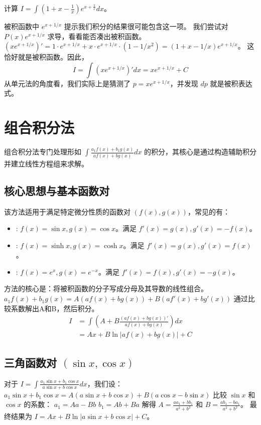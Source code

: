 \documentclass[lang=cn,newtx,10pt,scheme=chinese]{elegantbook}
\renewcommand{\textbf}[1]{\text{\heiti #1}}
\begin{document}
\begin{problem}
    计算 $I = \int(1+x-\frac{1}{x})e^{x+\frac{1}{x}}dx$。
\end{problem}
\begin{solution}
    被积函数中 $e^{x+1/x}$ 提示我们积分的结果很可能包含这一项。
    我们尝试对 $P(x)e^{x+1/x}$ 求导，看看能否凑出被积函数。
    $(x e^{x+1/x})' = 1 \cdot e^{x+1/x} + x \cdot e^{x+1/x} \cdot (1-1/x^2) = (1+x-1/x) e^{x+1/x}$。
    这恰好就是被积函数。因此，
    \begin{equation*}
        I = \int (x e^{x+1/x})' dx = x e^{x+1/x} + C
    \end{equation*}
    从单元法的角度看，我们实际上是猜测了 $p=xe^{x+1/x}$，并发现 $dp$ 就是被积表达式。
\end{solution}
\chapter{组合积分法}

组合积分法专门处理形如 $\int \frac{a_1 f(x) + b_1 g(x)}{a f(x) + b g(x)} dx$ 的积分，其核心是通过构造辅助积分并建立线性方程组来求解。

\section{核心思想与基本函数对}
该方法适用于满足特定微分性质的函数对 $(f(x), g(x))$，常见的有：
\begin{itemize}
    \item \textbf{三角函数对}: $f(x)=\sin x, g(x)=\cos x$。满足 $f'(x)=g(x), g'(x)=-f(x)$。
    \item \textbf{双曲函数对}: $f(x)=\sinh x, g(x)=\cosh x$。满足 $f'(x)=g(x), g'(x)=f(x)$。
    \item \textbf{指数函数对}: $f(x)=e^x, g(x)=e^{-x}$。满足 $f'(x)=f(x), g'(x)=-g(x)$。
\end{itemize}
方法的核心是：将被积函数的分子写成分母及其导数的线性组合。
$a_1 f(x) + b_1 g(x) = A(a f(x) + b g(x)) + B(a f'(x) + b g'(x))$
通过比较系数解出A和B，然后积分。
\begin{align*}
    I &= \int (A + B \frac{(a f(x) + b g(x))'}{a f(x) + b g(x)}) dx \\
      &= Ax + B \ln|a f(x) + b g(x)| + C
\end{align*}

\section{三角函数对 $(\sin x, \cos x)$}
对于 $I = \int \frac{a_1 \sin x + b_1 \cos x}{a \sin x + b \cos x} dx$，我们设：
$a_1 \sin x + b_1 \cos x = A(a \sin x + b \cos x) + B(a \cos x - b \sin x)$
比较 $\sin x$ 和 $\cos x$ 的系数：
$a_1 = Aa - Bb$
$b_1 = Ab + Ba$
解得 $A = \frac{aa_1+bb_1}{a^2+b^2}$ 和 $B = \frac{ab_1-ba_1}{a^2+b^2}$。
最终结果为 $I = Ax + B \ln|a \sin x + b \cos x| + C$。
\end{document}
